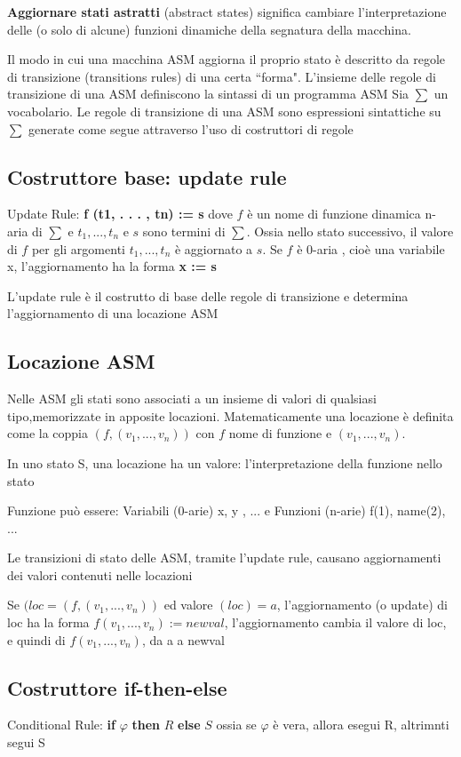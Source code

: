 \documentclass{article}
\begin{document}
\textbf{Aggiornare stati astratti} (abstract states) significa cambiare l’interpretazione delle (o solo di alcune) funzioni dinamiche della segnatura della macchina.

Il modo in cui una macchina ASM aggiorna il proprio stato è descritto da regole di transizione (transitions rules) di una certa “forma".
L’insieme delle regole di transizione di una ASM definiscono la sintassi di un programma ASM
Sia $\sum$ un vocabolario. Le regole di transizione di una ASM sono espressioni sintattiche su $\sum$ generate come segue attraverso l’uso di costruttori di regole

\subsection*{Costruttore base: update rule}
Update Rule: \textbf{f (t1, . . . , tn) := s} dove $f$ è un nome di funzione dinamica n-aria di $\sum$ e $t_1, . . . , t_n$ e $s$ sono termini di $\sum$. Ossia nello stato successivo, il valore di $f$ per gli argomenti  $t_1, . . . , t_n$ è aggiornato a $s$. Se $f$ è 0-aria , cioè una variabile x, l’aggiornamento ha la forma \textbf{x := s}

L’update rule è il costrutto di base delle regole di transizione  e determina l’aggiornamento di una locazione ASM

\subsection*{Locazione ASM}

Nelle ASM gli stati sono associati a un insieme di valori di qualsiasi tipo,memorizzate in apposite locazioni. Matematicamente una locazione è definita come la coppia $(f, (v_1, ..., v_n))$ con $f$ nome di funzione e $(v_1, ..., v_n)$.

In uno stato S, una locazione ha un valore: l’interpretazione della funzione nello stato

Funzione può essere:  Variabili (0-arie)  x, y , ... e Funzioni (n-arie) f(1), name(2), ...

Le transizioni di stato delle ASM, tramite l’update rule, causano aggiornamenti dei valori contenuti nelle locazioni

Se $(loc = (f,(v_1, ..., v_n))$ ed valore $(loc) = a$, l’aggiornamento (o update) di loc ha la forma $f(v_1, ..., v_n) := newval$, l’aggiornamento cambia il valore di loc, e quindi di $f(v_1, ..., v_n)$, da a a newval

\subsection*{Costruttore if-then-else}
 Conditional Rule: \textbf{if} $\varphi$ \textbf{then} $R$ \textbf{else} $S$ ossia se $\varphi$ è vera, allora esegui R, altrimnti segui S 
\end{document}
